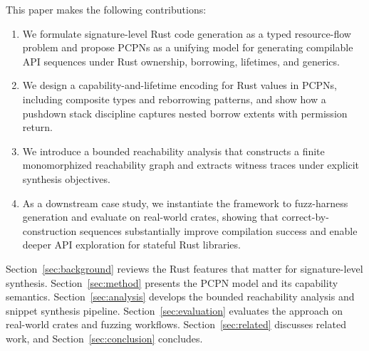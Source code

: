 \documentclass[sigconf]{acmart}
\begin{document}
This paper makes the following contributions:
\begin{enumerate}
  \item[1.] We formulate signature-level Rust code generation as a typed resource-flow problem and propose PCPNs as a unifying model
  for generating compilable API sequences under Rust ownership, borrowing, lifetimes, and generics.

  \item[2.] We design a capability-and-lifetime encoding for Rust values in PCPNs, including composite types and reborrowing patterns, and show how a pushdown stack discipline captures nested borrow extents with permission return.

  \item[3.] We introduce a bounded reachability analysis that constructs a finite monomorphized reachability graph and extracts witness traces under explicit synthesis objectives.

  \item[4.] As a downstream case study, we instantiate the framework to fuzz-harness generation and evaluate on real-world crates, showing that correct-by-construction sequences substantially improve compilation success and enable deeper API exploration for stateful Rust libraries.
\end{enumerate}

Section~\ref{sec:background} reviews the Rust features that matter for signature-level synthesis.
Section~\ref{sec:method} presents the PCPN model and its capability semantics.
Section~\ref{sec:analysis} develops the bounded reachability analysis and snippet synthesis pipeline.
Section~\ref{sec:evaluation} evaluates the approach on real-world crates and fuzzing workflows.
Section~\ref{sec:related} discusses related work, and Section~\ref{sec:conclusion} concludes.


\end{document}
